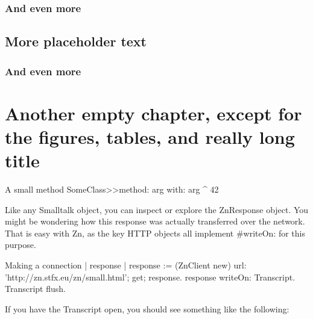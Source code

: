 \documentclass{sbabook}
\begin{document}
\textlatin{\lipsum[3]}


\subsection{And even more}

\textlatin{\lipsum[4]}


\section{More placeholder text}

\textlatin{\lipsum[3]}


\subsection{And even more}

\textlatin{\lipsum[4]}



\chapter{Another empty chapter, except for the figures, tables, and really long title}

\begin{leftbar}
    \lipsum[2]
\end{leftbar}

\begin{script}[fortytwo]{A small method}
SomeClass>>method: arg with: arg
    ^ 42
\end{script}

Like any Smalltalk object, you can inspect or explore the ZnResponse object. You might be wondering how this response was actually transferred over the network. That is easy with Zn, as the key HTTP objects all implement \#writeOn: for this purpose.

\begin{script}{Making a connection}
| response |
response := (ZnClient new)
  url: 'http://zn.stfx.eu/zn/small.html';
  get;
  response.
response writeOn: Transcript.
Transcript flush.
\end{script}

If you have the Transcript open, you should see something like the following:
\end{document}
